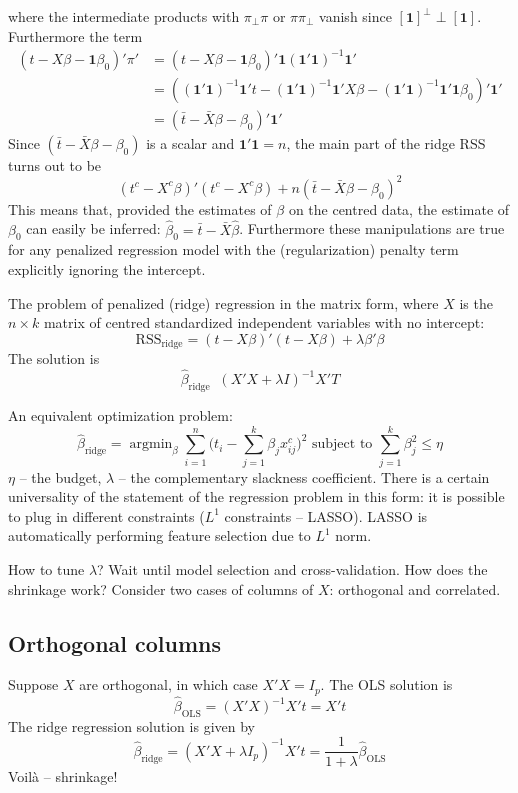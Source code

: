 \documentclass[a4paper]{article}
\newcommand{\brac}[1]{{\left ( #1 \right )}}
\newcommand{\RSS}{\text{RSS}}
\newcommand{\argmin}{\mathop{\text{argmin}}}
\newcommand{\one}{\mathbf{1}}
\newcommand{\defn}{\mathop{\overset{\Delta}{=}}\nolimits}
\begin{document}
where the intermediate products with $\pi_\perp \pi$ or $\pi \pi_\perp$ vanish
since $[\one]^\perp \perp [\one]$. Furthermore the term
\begin{align*}
(t - X\beta - \one\beta_0)'\pi'
	&= (t - X\beta - \one\beta_0)'\one(\one'\one)^{-1}\one'\\
	&= ((\one'\one)^{-1}\one't - (\one'\one)^{-1}\one'X\beta - (\one'\one)^{-1}\one'\one\beta_0)'\one'\\
	&= (\bar{t} - \bar{X}\beta - \beta_0)'\one'
\end{align*}
Since $(\bar{t} - \bar{X}\beta - \beta_0)$ is a scalar and $\one'\one = n$, the
main part of the ridge RSS turns out to be
\[
(t^c - X^c\beta)'(t^c - X^c\beta) + n (\bar{t} - \bar{X}\beta - \beta_0)^2
\]
This means that, provided the estimates of $\beta$ on the centred data, the estimate
of $\beta_0$ can easily be inferred: $\hat{\beta}_0 = \bar{t} - \bar{X}\hat{\beta}$.
Furthermore these manipulations are true for any penalized regression model with
the (regularization) penalty term explicitly ignoring the intercept.

The problem of penalized (ridge) regression in the matrix form, where $X$ is the
$n\times k$ matrix of centred standardized independent variables with no intercept:
\[\RSS_\text{ridge} = (t-X\beta)'(t-X\beta) + \lambda \beta'\beta\]
The solution is
\[\hat{\beta}_{\text{ridge}}\defn \brac{X'X + \lambda I}^{-1} X'T\]

An equivalent optimization problem:
\[
\hat{\beta}_{\text{ridge}}
= \argmin_{\beta} \sum_{i=1}^n \bigl(t_i - \sum_{j=1}^k \beta_j x_{ij}^c\bigr)^2
\text{ subject to } \sum_{j=1}^k \beta_j^2 \leq \eta
\]
$\eta$ -- the budget, $\lambda$ -- the complementary slackness coefficient.
There is a certain universality of the statement of the regression problem in
this form: it is possible to plug in different constraints ($L^1$ constraints -- LASSO).
LASSO is automatically performing feature selection due to $L^1$ norm.

How to tune $\lambda$? Wait until model selection and cross-validation. How does
the shrinkage work? Consider two cases of columns of $X$: orthogonal and correlated.

\subsection*{Orthogonal columns} %
\label{sub:orthogonal_columns}

Suppose $X$ are orthogonal, in which case $X'X = I_p$. The OLS solution is
\[\hat{\beta}_\text{OLS} = (X'X)^{-1}X't = X't\]
The ridge regression solution is given by 
\[
\hat{\beta}_\text{ridge}
= \brac{X'X + \lambda I_p}^{-1} X't
= \frac{1}{1+\lambda} \hat{\beta}_{\text{OLS}}
\]
Voil\`a -- shrinkage!
\end{document}
